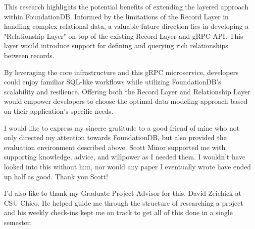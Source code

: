 \documentclass[sigconf]{acmart}
\begin{document}
This research highlights the potential benefits of extending the layered approach within FoundationDB.
Informed by the limitations of the Record Layer in handling complex relational data, a valuable future direction lies in developing a "Relationship Layer" on top of the existing Record Layer and gRPC API.
This layer would introduce support for defining and querying rich relationships between records.

By leveraging the core infrastructure and this gRPC microservice, developers could enjoy familiar SQL-like workflows while utilizing FoundationDB's scalability and resilience.
Offering both the Record Layer and Relationship Layer would empower developers to choose the optimal data modeling approach based on their application's specific needs.

\begin{acks}
I would like to express my sincere gratitude to a good friend of mine who not only directed my attention towards FoundationDB, but also provided the evaluation environment described above.
Scott Minor supported me with supporting knowledge, advice, and willpower as I needed them.
I wouldn't have looked into this without him, nor would any paper I eventually wrote have ended up half as good.
Thank you Scott!

I'd also like to thank my Graduate Project Advisor for this, David Zeichick at CSU Chico.
He helped guide me through the structure of researching a project and his weekly check-ins kept me on track to get all of this done in a single semester.
\end{acks}



\end{document}
